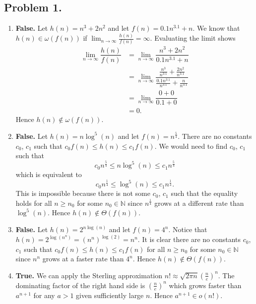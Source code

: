 \documentclass[11pt, letterpaper, titlepage]{article}
\begin{document}
\onehalfspacing

\subsection*{Problem 1.}
\begin{enumerate}[label=\alph*)]
    \item \textbf{False.} Let $h(n) = n^3 + 2n^2$ and let $f(n) = 0.1n^{3.1} + n$. We know that $h(n) \in \omega(f(n))$ if $\lim_{n\to\infty} \frac{h(n)}{f(n)} = \infty$. Evaluating the limit shows 
    \begin{align}
        \lim_{n\to\infty} \dfrac{h(n)}{f(n)} &= \lim_{n\to\infty} \dfrac{ n^3 + 2n^2 }{ 0.1n^{3.1} + n } \\
        &= \lim_{n\to\infty} \dfrac{ \frac{n^3}{n^{3.1}} + \frac{2n^2}{n^{3.1}} }{ \frac{0.1n^{3.1}}{n^{3.1}} + \frac{n}{n^{3.1}} } \\
        &= \lim_{n\to\infty} \dfrac{ 0 + 0 }{ 0.1 + 0 } \\
        &= 0.
    \end{align}
    Hence $h(n) \notin \omega(f(n))$.

    \item \textbf{False.} Let $h(n) = n\log^5(n)$ and let $f(n) = n^{\frac{5}{4}}$. There are no constants $c_0$, $c_1$ such that $c_0f(n) \leq h(n) \leq c_1f(n)$. We would need to find $c_0$, $c_1$ such that
    \begin{equation}
        c_0 n^{\frac{5}{4}} \leq n\log^5(n) \leq c_1n^{\frac{5}{4}}
    \end{equation}
    which is equivalent to
    \begin{equation}
        c_0 n^{\frac{1}{4}} \leq \log^5(n) \leq c_1n^{\frac{1}{4}}.
    \end{equation}
    This is impossible because there is not some $c_0$, $c_1$ such that the equality holds for all $n \geq n_0$ for some $n_0 \in \mathbb{N}$ since $n^{\frac{1}{4}}$ grows at a different rate than $\log^5(n)$. Hence $h(n) \notin \Theta(f(n))$.

    \item \textbf{False.} Let $h(n) = 2^{n\log(n)}$ and let $f(n) = 4^n$. Notice that $h(n) = 2^{\log(n^n)} = \left(n^n\right)^{\log(2)} = n^n$. It is clear there are no constants $c_0$, $c_1$ such that $c_0f(n) \leq h(n) \leq c_1f(n)$ for all $n \geq n_0$ for some $n_0 \in \mathbb{N}$ since $n^n$ grows at a faster rate than $4^n$. Hence $h(n) \notin \Theta(f(n))$.
    
    \item \textbf{True.} We can apply the Sterling approximation $n! \approx \sqrt{2\pi n} \left(\frac{n}{e}\right)^n$. The dominating factor of the right hand side is $\left(\frac{n}{e}\right)^n$ which grows faster than $a^{n+1}$ for any $a > 1$ given sufficiently large $n$. Hence $a^{n+1} \in o(n!)$.
    

\end{enumerate}
\end{document}
